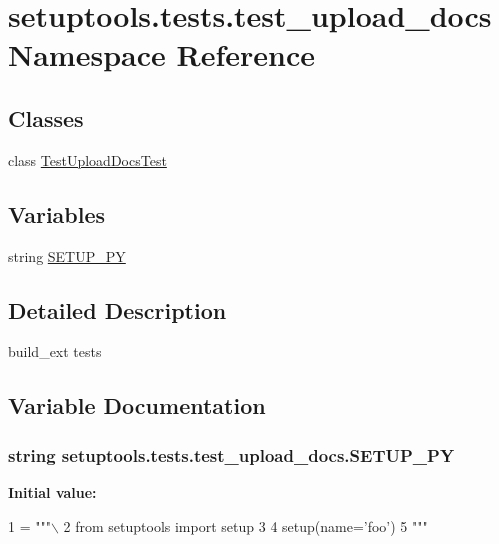 \hypertarget{namespacesetuptools_1_1tests_1_1test__upload__docs}{}\section{setuptools.\+tests.\+test\+\_\+upload\+\_\+docs Namespace Reference}
\label{namespacesetuptools_1_1tests_1_1test__upload__docs}
\subsection*{Classes}
\begin{DoxyCompactItemize}
\item 
class \hyperlink{classsetuptools_1_1tests_1_1test__upload__docs_1_1TestUploadDocsTest}{Test\+Upload\+Docs\+Test}
\end{DoxyCompactItemize}
\subsection*{Variables}
\begin{DoxyCompactItemize}
\item 
string \hyperlink{namespacesetuptools_1_1tests_1_1test__upload__docs_a10489e6b8704c85a608c22bf02dd9661}{S\+E\+T\+U\+P\+\_\+\+P\+Y}
\end{DoxyCompactItemize}


\subsection{Detailed Description}
\begin{DoxyVerb}build_ext tests
\end{DoxyVerb}
 

\subsection{Variable Documentation}
\hypertarget{namespacesetuptools_1_1tests_1_1test__upload__docs_a10489e6b8704c85a608c22bf02dd9661}{}
\subsubsection[{S\+E\+T\+U\+P\+\_\+\+P\+Y}]{\setlength{\rightskip}{0pt plus 5cm}string setuptools.\+tests.\+test\+\_\+upload\+\_\+docs.\+S\+E\+T\+U\+P\+\_\+\+P\+Y}\label{namespacesetuptools_1_1tests_1_1test__upload__docs_a10489e6b8704c85a608c22bf02dd9661}
{\bfseries Initial value\+:}
\begin{DoxyCode}
1 = \textcolor{stringliteral}{"""\(\backslash\)}
2 \textcolor{stringliteral}{from setuptools import setup}
3 \textcolor{stringliteral}{}
4 \textcolor{stringliteral}{setup(name='foo')}
5 \textcolor{stringliteral}{"""}
\end{DoxyCode}
